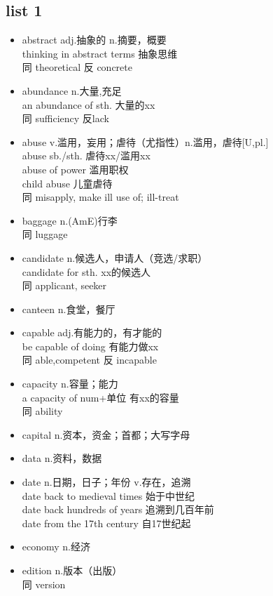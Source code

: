 \documentclass[11pt,a4paper,UTF8,titlepage]{ctexrep} %
\begin{document}
    \subsection{list 1}
    \begin{multicols}{2}
    \begin{itemize}
        \item abstract adj.抽象的 n.摘要，概要\\thinking in abstract terms 抽象思维\\同 theoretical 反 concrete
        \item abundance n.大量,充足\\an abundance of sth. 大量的xx\\同 sufficiency 反lack
        \item abuse v.滥用，妄用；虐待（尤指性）n.滥用，虐待[U,pl.]\\abuse sb./sth. 虐待xx/滥用xx\\ abuse of power 滥用职权\\ child abuse 儿童虐待\\同 misapply, make ill use of; ill-treat
        \item baggage n.(AmE)行李 \\同 luggage
        \item candidate n.候选人，申请人（竞选/求职）\\candidate for sth. xx的候选人\\同 applicant, seeker
        \item canteen n.食堂，餐厅
        \item capable adj.有能力的，有才能的\\be capable of doing 有能力做xx\\同 able,competent 反 incapable
        \item capacity n.容量；能力\\a capacity of num+单位 有xx的容量\\同 ability
        \item capital n.资本，资金；首都；大写字母
        \item data n.资料，数据
        \item date n.日期，日子；年份 v.存在，追溯\\date back to medieval times 始于中世纪\\date back hundreds of years 追溯到几百年前\\date from the 17th century 自17世纪起
        \item economy n.经济
        \item edition n.版本（出版）\\同 version

\end{itemize}
\end{multicols}
\end{document}
